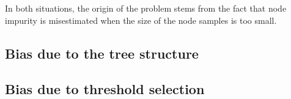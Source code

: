 In both situations, the origin of the problem stems from the fact
that node impurity is misestimated when the size of the node samples
is too small.





%

\subsection{Bias due to the tree structure}
\label{sec:bias:tree}

%

\subsection{Bias due to threshold selection}

%
%
%

